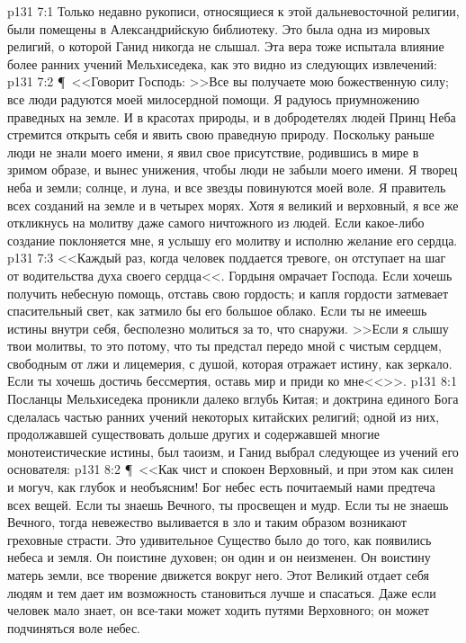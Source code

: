 \vs p131 7:1 Только недавно рукописи, относящиеся к этой дальневосточной религии, были помещены в Александрийскую библиотеку. Это была одна из мировых религий, о которой Ганид никогда не слышал. Эта вера тоже испытала влияние более ранних учений Мельхиседека, как это видно из следующих извлечений:
\vs p131 7:2 \P\ <<Говорит Господь: >>Все вы получаете мою божественную силу; все люди радуются моей милосердной помощи. Я радуюсь приумножению праведных на земле. И в красотах природы, и в добродетелях людей Принц Неба стремится открыть себя и явить свою праведную природу. Поскольку раньше люди не знали моего имени, я явил свое присутствие, родившись в мире в зримом образе, и вынес унижения, чтобы люди не забыли моего имени. Я творец неба и земли; солнце, и луна, и все звезды повинуются моей воле. Я правитель всех созданий на земле и в четырех морях. Хотя я великий и верховный, я все же откликнусь на молитву даже самого ничтожного из людей. Если какое\hyp{}либо создание поклоняется мне, я услышу его молитву и исполню желание его сердца.
\vs p131 7:3 <<Каждый раз, когда человек поддается тревоге, он отступает на шаг от водительства духа своего сердца<<. Гордыня омрачает Господа. Если хочешь получить небесную помощь, отставь свою гордость; и капля гордости затмевает спасительный свет, как затмило бы его большое облако. Если ты не имеешь истины внутри себя, бесполезно молиться за то, что снаружи. >>Если я слышу твои молитвы, то это потому, что ты предстал передо мной с чистым сердцем, свободным от лжи и лицемерия, с душой, которая отражает истину, как зеркало. Если ты хочешь достичь бессмертия, оставь мир и приди ко мне<<>>.
\vs p131 8:1 Посланцы Мельхиседека проникли далеко вглубь Китая; и доктрина единого Бога сделалась частью ранних учений некоторых китайских религий; одной из них, продолжавшей существовать дольше других и содержавшей многие монотеистические истины, был таоизм, и Ганид выбрал следующее из учений его основателя:
\vs p131 8:2 \P\ <<Как чист и спокоен Верховный, и при этом как силен и могуч, как глубок и необъясним! Бог небес есть почитаемый нами предтеча всех вещей. Если ты знаешь Вечного, ты просвещен и мудр. Если ты не знаешь Вечного, тогда невежество выливается в зло и таким образом возникают греховные страсти. Это удивительное Существо было до того, как появились небеса и земля. Он поистине духовен; он один и он неизменен. Он воистину матерь земли, все творение движется вокруг него. Этот Великий отдает себя людям и тем дает им возможность становиться лучше и спасаться. Даже если человек мало знает, он все\hyp{}таки может ходить путями Верховного; он может подчиняться воле небес.
